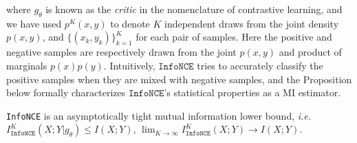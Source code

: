\documentclass{article}
\theoremstyle{plain}
\theoremstyle{definition}
\theoremstyle{remark}
\newcommand{\infonce}{\texttt{InfoNCE}}
\renewcommand{\CD}{\mathcal{D}}
\begin{document}
		where $g_{\theta}$ is known as the {\it critic} in the nomenclature of contrastive learning,  and we have used $p^K(x,y)$ to denote $K$ independent draws from the joint density $p(x,y)$, and $\{(x_k, y_k)\}_{k=1}^K$ for each pair of samples. Here the positive and negative samples are respectively drawn from the joint $p(x,y)$ and product of marginals $p(x)p(y)$. Intuitively, $\infonce$ tries to accurately classify the positive samples when they are mixed with negative samples, and the Proposition below formally characterizes $\infonce$'s statistical properties as a MI estimator. 
		\begin{prop}
			\label{thm:infonce}
			\texttt{InfoNCE} is an asymptotically tight mutual information lower bound, {\it i.e.} $I_{\infonce}^K(X;Y|g_{\theta}) \leq I(X;Y)$, $\lim_{K\rightarrow\infty} I_{\infonce}^K(X;Y) \rightarrow I(X;Y).$
		\end{prop}
		
		
\end{document}
